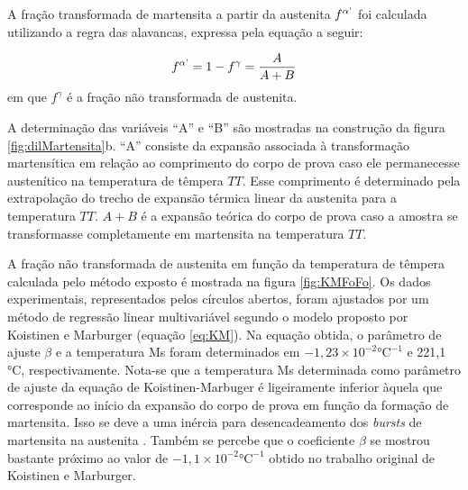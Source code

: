A fração transformada de martensita a partir da austenita $f^{\alpha\text{\textquoteright}}$ foi calculada utilizando a regra das alavancas, expressa pela equação a seguir:

\begin{equation}
	f^{\alpha\text{\textquoteright}} = 1 - f^\gamma = \frac{A}{A + B}
	\label{eq:levelRule}
\end{equation}
%
em que $f^\gamma$ é a fração não transformada de austenita.

A determinação das variáveis ``A'' e ``B'' são mostradas na construção da figura \ref{fig:dilMartensita}b. ``A'' consiste da expansão associada à transformação martensítica em relação ao comprimento do corpo de prova caso ele permanecesse austenítico na temperatura de têmpera $TT$. Esse comprimento é determinado pela extrapolação do trecho de expansão térmica linear da austenita para a temperatura $TT$. $A + B$ é a expansão teórica do corpo de prova caso a amostra se transformasse completamente em martensita na temperatura $TT$.

A fração não transformada de austenita em função da temperatura de têmpera calculada pelo método exposto é mostrada na figura \ref{fig:KMFoFo}. Os dados experimentais, representados pelos círculos abertos, foram ajustados por um método de regressão linear multivariável segundo o modelo proposto por Koistinen e Marburger (equação \ref{eq:KM}). Na equação obtida, o parâmetro de ajuste $\beta$ e a temperatura Ms foram determinados em $-1,23 \times 10^{-2} \text{°C}^{-1}$ e 221,1 °C, respectivamente. Nota-se que a temperatura Ms determinada como parâmetro de ajuste da equação de Koistinen-Marbuger é ligeiramente inferior àquela que corresponde ao início da expansão do corpo de prova em função da formação de martensita. Isso se deve a uma inércia para desencadeamento dos \textit{bursts} de martensita na austenita \cite{VanBohemen2008}. Também se percebe que o coeficiente $\beta$ se mostrou bastante próximo ao valor de $-1,1 \times 10^{-2} \text{°C}^{-1}$ obtido no trabalho original de Koistinen e Marburger\cite{Koistinen1959}.

